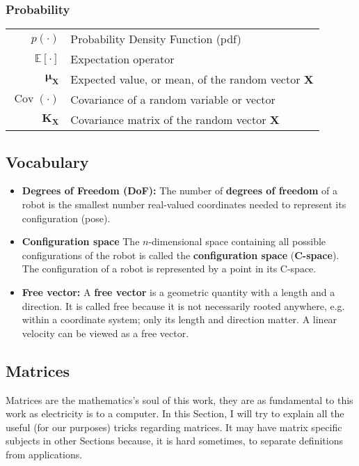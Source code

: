 \documentclass[12pt]{article}
\newcommand{\mat}[1]{\mathbf{#1}}
\newcommand{\brac}[1]{\left[#1\right]} %
\newcommand{\parentheses}[1]{\left(#1\right)}
\newcommand{\pr}[1]{p\parentheses{#1}}
\newcommand{\cov}[1]{\mathop{Cov}\parentheses{#1}}
\newcommand{\mb}[1]{{\boldsymbol{#1}}} %
\newcommand{\expv}[1]{\mathbb{E}\brac{#1}} %
\begin{document}
\subsubsection*{Probability}
\begin{table}[h]
    \centering
    \begin{tabularx}{\textwidth}{|rX|}
        \hline
         $\pr{\cdot}$ &     Probability Density Function (pdf) \\
         $\expv{\cdot}$ &   Expectation operator \\
         $\mb{\mu_X}$ &     Expected value, or mean, of the random vector $\mb{X}$ \\
         $\cov{\cdot}$ &    Covariance of a random variable or vector \\
         $\mat{K}_{\mb{X}}$ & Covariance matrix of the random vector $\mb{X}$
         \\ \hline
    \end{tabularx}
\end{table}

\subsection{Vocabulary}
\begin{itemize}
    \item \textbf{Degrees of Freedom (DoF):} The number of \textbf{degrees of freedom} of a robot is the smallest number real-valued coordinates needed to represent its configuration \cite{lynch2017modern} (pose).
    \item{\textbf{Configuration space}} The $n$-dimensional space containing all possible configurations of the robot is called the \textbf{configuration space} (\textbf{C-space}). The configuration of a robot is represented by a point in its C-space. \cite{lynch2017modern}
    \item{\textbf{Free vector:} A \textbf{free vector} is a geometric quantity with a length and a direction. It is called free because it is not necessarily rooted anywhere, e.g. within a coordinate system; only its length and direction matter. A linear velocity can be viewed as a free vector.}
\end{itemize}

\subsection{Matrices}
Matrices are the mathematics's soul of this work, they are as fundamental to this work as electricity is to a computer. In this Section, I will try to explain all the useful (for our purposes) tricks regarding matrices. It may have matrix specific subjects in other Sections because, it is hard sometimes, to separate definitions from applications.
\end{document}
